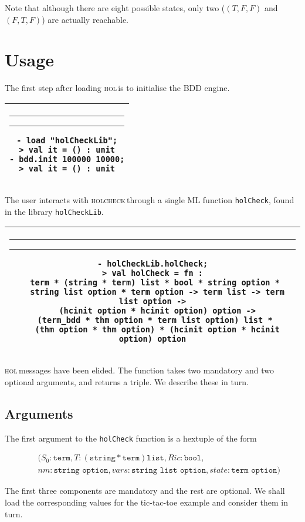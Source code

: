 \documentclass{article}
\makeatletter
\newcommand{\hc}{\textsc{holcheck\,}}
\newcommand{\hol}{\textsc{hol\,}}
\newlength{\hsbw}
\newcounter{sessioncount}
\newcommand\MLSpacing{13pt}
\newenvironment{session}{\begin{flushleft}
 \begin{tabular}{@{}|c@{}|@{}}\hline 
 \begin{minipage}[b]{\hsbw}
 \vspace*{-.5pt}
 \begin{flushright}
 \rule{0.01in}{.15in}\rule{0.3in}{0.01in}\hspace{-0.35in}
 \raisebox{0.04in}{\makebox[0.3in][c]{\footnotesize\sl \thesessioncount}}
 \end{flushright}
 \vspace*{-.45in}
 \begingroup\small\baselineskip\MLSpacing}{\endgroup\end{minipage}\\ \hline 
 \end{tabular}
 \end{flushleft}
 \stepcounter{sessioncount}}
\makeatother
\begin{document}
Note that although there are eight possible states, only two (\((T,F,F)\) and \((F,T,F) \)) are actually reachable.

\section{Usage}

The first step after loading \hol is to initialise the BDD engine.

\begin{session}\begin{verbatim}
- load "holCheckLib";
> val it = () : unit
- bdd.init 100000 10000;
> val it = () : unit
\end{verbatim}\end{session}

The user interacts with \hc through a single ML function \texttt{holCheck}, found in the library \texttt{holCheckLib}. 

\begin{session}\begin{verbatim}
- holCheckLib.holCheck;
> val holCheck = fn :
  term * (string * term) list * bool * string option * 
  string list option * term option -> term list -> term list option ->
  (hcinit option * hcinit option) option ->
  (term_bdd * thm option * term list option) list * 
  (thm option * thm option) * (hcinit option * hcinit option) option
\end{verbatim}\end{session}

\hol messages have been elided. The function takes two mandatory and two optional arguments, and returns a triple. We describe these in turn. 

\subsection{Arguments}

The first argument to the \texttt{holCheck} function is a hextuple of the form 

\begin{eqnarray*} 
&&(S_0:\mathtt{term}, T:\mathtt{(string * term) list}, Ric:\mathtt{bool}, \\
&&nm:\mathtt{string\,\,option}, vars:\mathtt{string\,\,list\,\,option}, state:\mathtt{term\,\,option}) 
\end{eqnarray*}
 
The first three components are mandatory and the rest are optional. We shall load the corresponding values for the tic-tac-toe example and consider them in turn.
\end{document}
